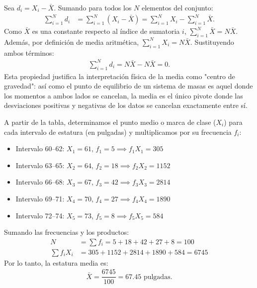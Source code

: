 \begin{solproblema}[prob:0b934f5]
	Sea $d_{i} = X_{i} - \bar{X}$. Sumando para todos los $N$ elementos del conjunto:
	\begin{align}
		\sum_{i=1}^{N} d_{i} &= \sum_{i=1}^{N} (X_{i} - \bar{X}) = \sum_{i=1}^{N} X_{i} - \sum_{i=1}^{N} \bar{X}.
	\end{align}
	Como $\bar{X}$ es una constante respecto al índice de sumatoria $i$, $\sum_{i=1}^{N} \bar{X} = N\bar{X}$. Además, por definición de media aritmética, $\sum_{i=1}^{N} X_{i} = N\bar{X}$. Sustituyendo ambos términos:
	\begin{align}
		\sum_{i=1}^{N} d_{i} = N\bar{X} - N\bar{X} = 0.
	\end{align}
	Esta propiedad justifica la interpretación física de la media como "centro de gravedad": así como el punto de equilibrio de un sistema de masas es aquel donde los momentos a ambos lados se cancelan, la media es el único pivote donde las desviaciones positivas y negativas de los datos se cancelan exactamente entre sí.
\end{solproblema}

\begin{solproblema}[prob:0c7ed43]
	A partir de la tabla, determinamos el punto medio o marca de clase ($X_{i}$) para cada intervalo de estatura (en pulgadas) y multiplicamos por su frecuencia $f_{i}$:
	\begin{itemize}
		\item Intervalo 60--62: $X_{1} = 61$, $f_{1} = 5 \implies f_{1}X_{1} = 305$
		\item Intervalo 63--65: $X_{2} = 64$, $f_{2} = 18 \implies f_{2}X_{2} = 1152$
		\item Intervalo 66--68: $X_{3} = 67$, $f_{3} = 42 \implies f_{3}X_{3} = 2814$
		\item Intervalo 69--71: $X_{4} = 70$, $f_{4} = 27 \implies f_{4}X_{4} = 1890$
		\item Intervalo 72--74: $X_{5} = 73$, $f_{5} = 8 \implies f_{5}X_{5} = 584$
	\end{itemize}
	Sumando las frecuencias y los productos:
	\begin{align}
		N &= \sum f_{i} = 5 + 18 + 42 + 27 + 8 = 100 \\
		\sum f_{i}X_{i} &= 305 + 1152 + 2814 + 1890 + 584 = 6745
	\end{align}
	Por lo tanto, la estatura media es:
	\begin{align}
		\bar{X} = \dfrac{6745}{100} = 67.45 \text{ pulgadas.}
	\end{align}
\end{solproblema}

